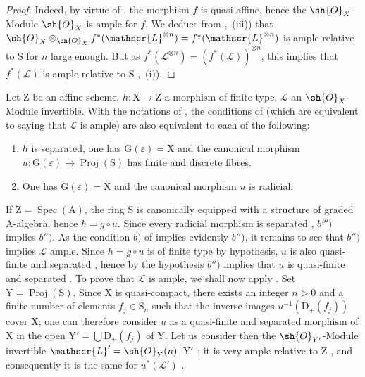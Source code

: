 \begin{proof}
Indeed, by virtue of , the morphism $f$ is quasi-affine, hence  the $\sh{O}_X$-Module $\sh{O}_X$ is ample for $f$.
We deduce from ,~(iii)) that $\sh{O}_X\otimes_{\sh{O}_X}f^*(\mathscr{L}^{\otimes n})=f^*(\mathscr{L}^{\otimes n})$ is ample relative to $\mathrm{S}$ for $n$ large enough.
But as $f^*(\mathscr{L}^{\otimes n})=(f^*(\mathscr{L}))^{\otimes n}$, this implies that $f^*(\mathscr{L})$ is ample relative to $\mathrm{S}$ ,~(i)).
\end{proof}

\begin{corollary}[18.12.17]
\label{IV.18.12.17}
Let $\mathrm{Z}$ be an affine scheme, $h:\mathrm{X}\to\mathrm{Z}$ a morphism of finite type, $\mathscr{L}$ an $\sh{O}_X$-Module invertible.
With the notations of , the conditions of  (which are equivalent to saying that $\mathscr{L}$ is ample) are also equivalent to each of the following:

\begin{enumerate}
  \item[\rm b$''$)] $h$ is separated, one has $\mathrm{G}(\varepsilon)=\mathrm{X}$ and the canonical morphism $u:\mathrm{G}(\varepsilon)\to\operatorname{Proj}(\mathrm{S})$ has finite and discrete fibres.
  \item[\rm b$'''$)] One has $\mathrm{G}(\varepsilon)=\mathrm{X}$ and the canonical morphism $u$ is radicial.
\end{enumerate}

If $\mathrm{Z}=\operatorname{Spec}(\mathrm{A})$, the ring $\mathrm{S}$ is canonically equipped with a structure of graded $\mathrm{A}$-algebra, hence $h=g\circ u$.
Since every radicial morphism is separated , $b''')$ implies $b'')$.
As the condition $b)$ of  implies evidently $b'')$, it remains to see that $b'')$ implies $\mathscr{L}$ ample.
Since $h=g\circ u$ is of finite type by hypothesis, $u$ is also quasi-finite and separated , hence by the hypothesis $b'')$ implies that $u$ is quasi-finite and separated .
To prove that $\mathscr{L}$ is ample, we shall now apply .
Set $\mathrm{Y}=\operatorname{Proj}(\mathrm{S})$.
Since $\mathrm{X}$ is quasi-compact, there exists an integer $n>0$ and a finite number of elements $f_j\in\mathrm{S}_n$ such that the inverse images $u^{-1}(\mathrm{D}_+(f_j))$ cover $\mathrm{X}$; one can therefore consider $u$ as a quasi-finite and separated morphism of $\mathrm{X}$ in the open $\mathrm{Y}'=\bigcup\mathrm{D}_+(f_j)$ of $\mathrm{Y}$.
Let us consider then the $\sh{O}_{Y'}$-Module invertible $\mathscr{L}'=\sh{O}_Y(n)\,|\,\mathrm{Y}'$ ; it is very ample relative to $\mathrm{Z}$ , and consequently it is the same for $u^*(\mathscr{L}')$ .


\end{corollary}
